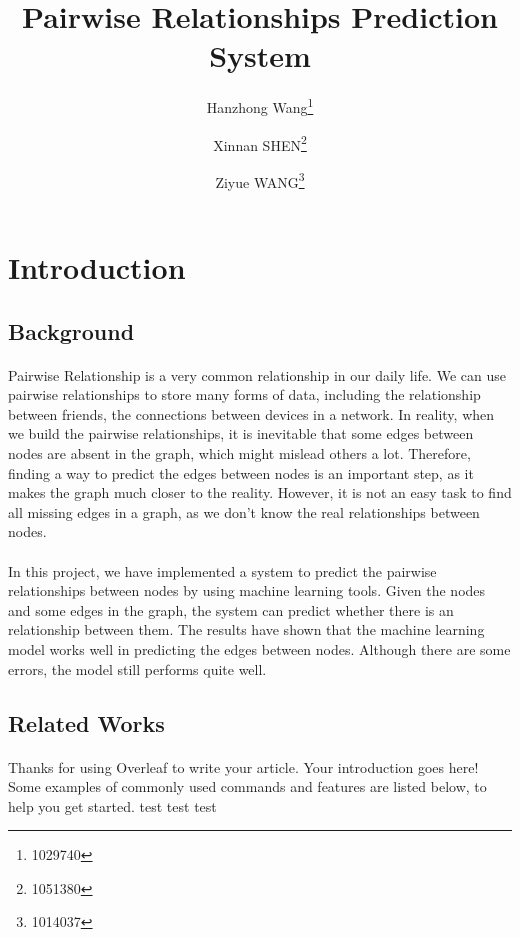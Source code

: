 \documentclass[fleqn,11pt]{olplainarticle}
\title{Pairwise Relationships Prediction System}
\author{Hanzhong Wang\thanks{1029740}}
\author{Xinnan SHEN\thanks{1051380}}
\author{Ziyue WANG\thanks{1014037}}
\affil{School of Computing and Information Systems, University of Melbourne}
\affil[]{\textit{\{hanzhongw,xinnan.shen, ziyue2\}}@student.unimelb.edu.au}
\begin{document}
\maketitle
\flushbottom
\thispagestyle{plain}
\pagestyle{plain}


\section{Introduction}\label{intro}

\subsection{Background}\label{bgd}
\paragraph*{}
Pairwise Relationship is a very common relationship in our daily life. We can use pairwise relationships to store many forms of data, including the relationship between friends, the connections between devices in a network. In reality, when we build the pairwise relationships, it is inevitable that some edges between nodes are absent in the graph, which might mislead others a lot. Therefore, finding a way to predict the edges between nodes is an important step, as it makes the graph much closer to the reality. However, it is not an easy task to find all missing edges in a graph, as we don't know the real relationships between nodes. 
\paragraph*{}
In this project, we have implemented a system to predict the pairwise relationships between nodes by using machine learning tools. Given the nodes and some edges in the graph, the system can predict whether there is an relationship between them. The results have shown that the machine learning model works well in predicting the edges between nodes. Although there are some errors, the model still performs quite well.

\subsection{Related Works}\label{relaw}
\paragraph{}
Thanks for using Overleaf to write your article. Your introduction goes here! Some examples of commonly used commands and features are listed below, to help you get started. test \cite{liben2007link} test \cite{lu2011link} test
\end{document}
